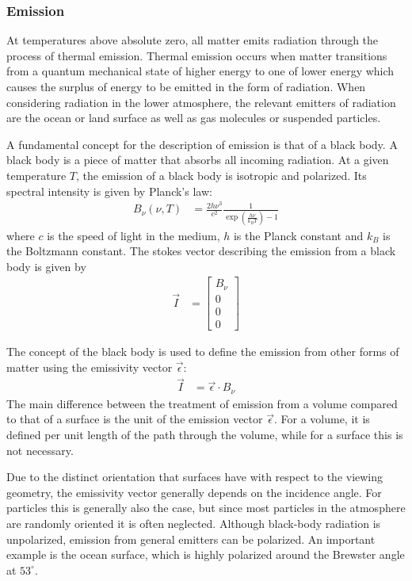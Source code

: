 \subsubsection{Emission}

At temperatures above absolute zero, all matter emits radiation through the
process of thermal emission. Thermal emission occurs when matter transitions
from a quantum mechanical state of higher energy to one of lower energy which
causes the surplus of energy to be emitted in the form of radiation. When
considering radiation in the lower atmosphere, the relevant emitters of
radiation are the ocean or land surface as well as gas molecules or suspended
particles.

A fundamental concept for the description of emission is that of a black body.
A black body is a piece of matter that absorbs all incoming radiation. At a
given temperature $T$, the emission of a black body is isotropic and polarized.
Its spectral intensity is given by Planck's law:
\begin{align}
  B_\nu(\nu, T) &= \frac{2h\nu^3}{c^2}\frac{1}{\exp ( \frac{h\nu}{k_B T} )- 1}
\end{align}
where $c$ is the speed of light in the medium, $h$ is the Planck constant and
$k_B$ is the Boltzmann constant. The stokes vector describing the emission from
a black body is given by
\begin{align}
  \vec{I} &= \left [ \begin{array}{c}B_\nu \\ 0 \\ 0 \\ 0\end{array} \right ]
\end{align}

The concept of the black body is used to define the emission from other forms
of matter using the emissivity vector $\vec{\epsilon}$:
\begin{align}
 \vec{I} &= \vec{\epsilon} \cdot B_\nu
\end{align}
The main difference between the treatment of emission from a volume compared
to that of a surface is the unit of the emission vector $\vec{\epsilon}$. For
a volume, it is defined per unit length of the path through the volume, while
for a surface this is not necessary.

Due to the distinct orientation that surfaces have with respect to the viewing
geometry, the emissivity vector generally depends on the incidence angle. For
particles this is generally also the case, but since most particles in the
atmosphere are randomly oriented it is often neglected. Although black-body
radiation is unpolarized, emission from general emitters can be polarized. An
important example is the ocean surface, which is highly polarized around the
Brewster angle at $53^\circ$.

